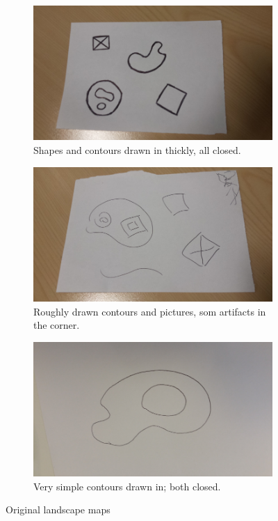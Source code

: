 \documentclass[11pt]{article}
\begin{document}
\begin{figure}[!ht]
	\begin{subfigure}[t]{.4\textwidth}
		\centering
		\includegraphics[scale=0.3]{pics/thicklines.jpg}
		\caption{Shapes and contours drawn in thickly, all closed.}
		\label{fig:landscapeMapThick}
	\end{subfigure}
	\hfill
	\begin{subfigure}[t]{.4\textwidth}
		\centering
		\includegraphics[scale=0.3]{pics/shitlines.jpg}
		\caption{Roughly drawn contours and pictures, som artifacts in the corner.}
		\label{fig:landscapeMapShit}
	\end{subfigure}
	
	
	\begin{subfigure}[t]{.4\textwidth}
		\centering
		\includegraphics[scale=0.3]{pics/simple.jpg}
		\caption{Very simple contours drawn in; both closed.}
		\label{fig:landscapeMapSimple}
	\end{subfigure}
	\caption{Original landscape maps}
	\label{fig:landscapeMaps}
\end{figure}
\end{document}
